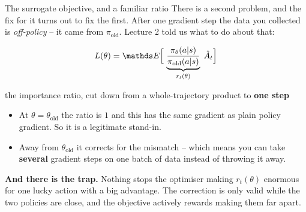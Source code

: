 \documentclass[aspectratio=169]{beamer}
\begin{document}
\begin{frame}{The surrogate objective, and a familiar ratio}
  \small
  There is a second problem, and the fix for it turns out to fix the first. After one gradient
  step the data you collected is \emph{off-policy} -- it came from $\pi_{\text{old}}$. Lecture 2
  told us what to do about that:

  \vskip 4pt
  \begin{center}
  \begin{tcolorbox}[colback=lightbg, colframe=popblue, boxrule=0.7pt, arc=2pt, width=0.86\textwidth]
    \[ L(\theta) = \E\Big[\, \underbrace{\frac{\pi_\theta(a|s)}{\pi_{\text{old}}(a|s)}}_{r_t(\theta)}\; \hat{A}_t \Big] \]
    \vskip -4pt
    \begin{center}\small
      the importance ratio, cut down from a whole-trajectory product to \textbf{one step}
    \end{center}
  \end{tcolorbox}
  \end{center}

  \vskip 6pt
  \begin{itemize}\itemsep2pt
    \item At $\theta = \theta_{\text{old}}$ the ratio is $1$ and this has the same gradient as
          plain policy gradient. So it is a legitimate stand-in.
    \item Away from $\theta_{\text{old}}$ it corrects for the mismatch -- which means you can
          take \textbf{several} gradient steps on one batch of data instead of throwing it away.
  \end{itemize}

  \vskip 6pt
  \begin{tcolorbox}[colback=armred!8, colframe=armred, boxrule=0.6pt, arc=2pt]
    \small
    \textbf{And there is the trap.} Nothing stops the optimiser making $r_t(\theta)$ enormous
    for one lucky action with a big advantage. The correction is only valid while the two
    policies are close, and the objective actively rewards making them far apart.
  \end{tcolorbox}
\end{frame}
\end{document}

